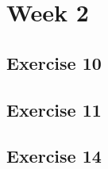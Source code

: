 



\section*{Week 2}
\subsection*{Exercise 10}



\newpage

\subsection*{Exercise 11}


\newpage
\subsection*{Exercise 14}












